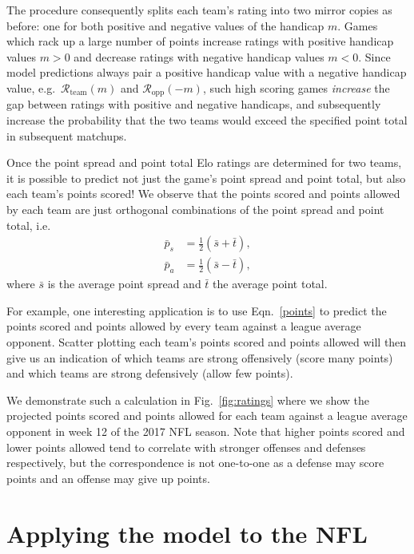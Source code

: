 \documentclass[aps,prc,reprint,amsmath,superscriptaddress,nofootinbib]{revtex4-1}
\begin{document}
The procedure consequently splits each team's rating into two mirror copies as before: one for both positive and negative values of the handicap $m$.
Games which rack up a large number of points increase ratings with positive handicap values $m > 0$ and decrease ratings with negative handicap values $m < 0$.
Since model predictions always pair a positive handicap value with a negative handicap value, e.g.\ $\mathcal{R}_\text{team}(m)$ and $\mathcal{R}_\text{opp}(-m)$, such high scoring games \emph{increase} the gap between ratings with positive and negative handicaps, and subsequently increase the probability that the two teams would exceed the specified point total in subsequent matchups.

Once the point spread and point total Elo ratings are determined for two teams, it is possible to predict not just the game's point spread and point total, but also each team's points scored!
We observe that the points scored and points allowed by each team are just orthogonal combinations of the point spread and point total, i.e.\
\begin{align}
  \bar{p}_s &= \tfrac{1}{2}(\bar{s} + \bar{t}),\nonumber \\
  \bar{p}_a &= \tfrac{1}{2}(\bar{s} - \bar{t}),
  \label{points}
\end{align}
where $\bar{s}$ is the average point spread and $\bar{t}$ the average point total.

For example, one interesting application is to use Eqn.~\eqref{points} to predict the points scored and points allowed by every team against a league average opponent.
Scatter plotting each team's points scored and points allowed will then give us an indication of which teams are strong offensively (score many points) and which teams are strong defensively (allow few points).

We demonstrate such a calculation in Fig.~\ref{fig:ratings} where we show the projected points scored and points allowed for each team against a league average opponent in week 12 of the 2017 NFL season.
Note that higher points scored and lower points allowed tend to correlate with stronger offenses and defenses respectively, but the correspondence is not one-to-one as a defense may score points and an offense may give up points.

\section{Applying the model to the NFL}
\end{document}

